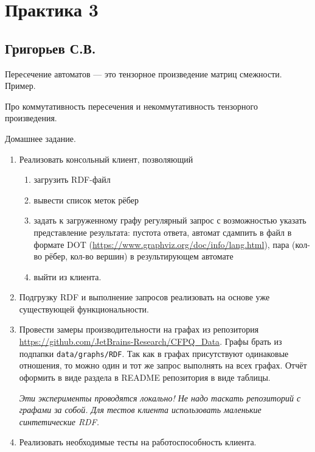 \section{Практика 3}

\subsection{Григорьев С.В.}

Пересечение автоматов --- это тензорное произведение матриц смежности. Пример.

Про коммутативность пересечения и некоммутативность тензорного произведения.

Домашнее задание.
\begin{enumerate}
	\item Реализовать консольный клиент, позволяющий
	\begin{enumerate}
		\item загрузить RDF-файл
		\item вывести список меток рёбер
		\item задать к загруженному графу регулярный запрос с возможностью указать представление результата: пустота ответа, автомат сдампить в файл в формате DOT (\url{https://www.graphviz.org/doc/info/lang.html}), пара (кол-во рёбер, кол-во вершин) в результирующем автомате
	    \item выйти из клиента.
    \end{enumerate}
	\item Подгрузку RDF и выполнение запросов реализовать на основе уже существующей функциональности.
	\item Провести замеры производительности на графах из репозитория \url{https://github.com/JetBrains-Research/CFPQ_Data}. Графы брать из подпапки \verb|data/graphs/RDF|. Так как в графах присутствуют одинаковые отношения, то можно один и тот же запрос выполнять на всех графах. Отчёт оформить в виде раздела в  README репозитория в виде таблицы.

	\textit{Эти эксперименты проводятся локально! Не надо таскать репозиторий с графами за собой. Для тестов клиента использовать маленькие синтетические RDF.}
	\item Реализовать необходимые тесты на работоспособность клиента.
\end{enumerate}
